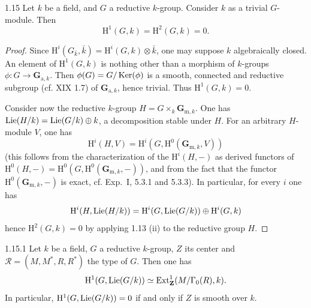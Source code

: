 \begin{corollary}{1.15}\label{XXIV.1.15}
Let $k$ be a field, and $G$ a reductive $k$-group. Consider $k$ as a trivial $G$-module. Then
\[
\mathrm H^1(G,k)=\mathrm H^2(G,k)=0.
\]
\end{corollary}
\begin{proof}
Since $\mathrm H^i(G_{\bar k},\bar k)=\mathrm H^i(G,k)\otimes\bar k$, one may suppose $k$ algebraically closed. An element of $\mathrm H^1(G,k)$ is nothing other than a morphism of $k$-groups $\phi:G\to\mathbf G_{\mathrm a,k}$. Then $\phi(G)=G/\operatorname{Ker}(\phi)$ is a smooth, connected and reductive subgroup (cf. XIX 1.7) of $\mathbf G_{\mathrm a,k}$, hence trivial. Thus $\mathrm H^1(G,k)=0$.

Consider now the reductive $k$-group $H=G\times_k\mathbf G_{\mathrm m,k}$. One has $\operatorname{Lie}(H/k)=\operatorname{Lie}(G/k)\oplus k$, a decomposition stable under $H$. For an arbitrary $H$-module $V$, one has
\[
\mathrm H^i(H,V)=\mathrm H^i(G,\mathrm H^0(\mathbf G_{\mathrm m,k},V))
\]
(this follows from the characterization of the $\mathrm H^i(H,-)$ as derived functors of $\mathrm H^0(H,-)=\mathrm H^0(G,\mathrm H^0(\mathbf G_{\mathrm m,k},-))$, and from the fact that the functor $\mathrm H^0(\mathbf G_{\mathrm m,k},-)$ is exact, cf. Exp.~I, 5.3.1 and 5.3.3). In particular, for every $i$ one has
\[
\mathrm H^i(H,\operatorname{Lie}(H/k))=\mathrm H^i(G,\operatorname{Lie}(G/k))\oplus\mathrm H^i(G,k)
\]
hence $\mathrm H^2(G,k)=0$ by applying 1.13 (ii) to the reductive group $H$.
\end{proof}
\begin{corollary}{1.15.1}\label{XXIV.1.15.1}
Let $k$ be a field, $G$ a reductive $k$-group, $Z$ its center and $\mathscr R=\allowbreak(M,\allowbreak M^*,\allowbreak R,\allowbreak R^*)$ the type of $G$. Then one has
\[
\mathrm H^1(G,\operatorname{Lie}(G/k))\simeq\operatorname{Ext}^1_{\mathbf{Z}}(M/\Gamma_0(R),k).
\]
In particular, $\mathrm H^1(G,\operatorname{Lie}(G/k))=0$ if and only if $Z$ is smooth over $k$.
\end{corollary}
